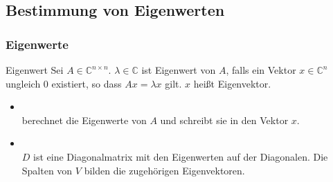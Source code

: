 \documentclass[hyperref={xetex}]{beamer}
\begin{document}
\subsection{Bestimmung von Eigenwerten}
% 
%
\begin{frame}[fragile]\frametitle{Eigenwerte}
\begin{block}{Eigenwert}
Sei $A \in \mathbb{C}^{n \times n}$. $\lambda \in \mathbb{C}$ ist
Eigenwert von $A$, falls ein Vektor $x \in \mathbb{C}^n$ ungleich $0$ existiert, so
dass  $Ax = \lambda x$ gilt. $x$ heißt Eigenvektor.  
\end{block}

\begin{itemize}
\item {}\\ berechnet die Eigenwerte von $A$ und schreibt
  sie in den Vektor $x$.
\item
  {}\\
  $D$ ist eine Diagonalmatrix mit den Eigenwerten auf der
  Diagonalen. Die Spalten von $V$ bilden die zugehörigen Eigenvektoren. 
\end{itemize}
\end{frame}
% 
%
\end{document}
